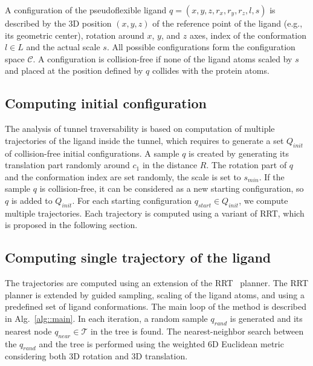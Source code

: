 \documentclass{svmult}
\def\qrand{q_{rand}}
\def\qstart{q_{start}}
\def\qinit{\qstart}
\def\qnear{q_{near}}
\def\T{\mathcal{T}}
\def\C{\mathcal{C}}
\def\CFD{{\mathcal{C}^s_{free}}}
\def\QI{Q_{init}}
\def\smin{s_{min}}
\def\L{L}
\begin{document}
A configuration of the pseudoflexible ligand $q=(x,y,z,r_x,r_y,r_z,l,s)$  is described
by the 3D position $(x,y,z)$ of the reference point of the ligand (e.g., its geometric center), rotation around $x$, $y$, and $z$ axes,
index of the conformation $l\in \L$ and the actual scale $s$.
All possible configurations form the configuration space $\C$. 
A configuration is collision-free if none of the ligand atoms scaled by $s$ and placed at the
position defined by $q$ collides with the protein atoms.


\subsection{Computing initial configuration}

The analysis of tunnel traversability is based on computation of multiple trajectories of the ligand inside the tunnel, which
requires to generate a set $\QI$ of collision-free initial configurations.
A sample $q$ is created by generating its translation part randomly around $c_1$ in the distance $R$.
The rotation part of $q$ and the conformation index are set randomly, the scale is set to $\smin$.
If the sample $q$ is collision-free, it can be considered as a new starting configuration, so $q$ is added to $\QI$.
For each starting configuration $\qinit \in \QI$, we compute multiple trajectories.
Each trajectory is computed using a variant of RRT, which is proposed in the following section.


\subsection{Computing single trajectory of the ligand}

The trajectories are computed using an extension of the RRT~\cite{lavalleRRT} planner.
The RRT planner is extended by guided sampling, scaling of the ligand atoms, and using a predefined set of ligand conformations.
The main loop of the method is described in Alg.~\ref{alg::main}.
In each iteration, a random sample $\qrand$ is generated and its nearest node $\qnear\in\T$ in the tree is found.
The nearest-neighbor search between the $\qrand$ and the tree is performed using the weighted 6D Euclidean metric considering
both 3D rotation and 3D translation.
\end{document}
